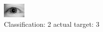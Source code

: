 \begin{figure}[h!]
\begin{center}
\includegraphics[width=0.60\columnwidth]{figures/ID3095_class_2_target_3.png}
\end{center}
\caption{ Classification: 2 actual target: 3}
\label{fig:ID3095_class_2_target_3}
\end{figure}
